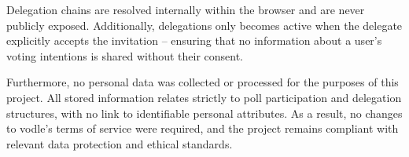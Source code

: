 Delegation chains are resolved internally within the browser and are never publicly exposed. Additionally, delegations only becomes active when the delegate explicitly accepts the invitation -- ensuring that no information about a user's voting intentions is shared without their consent.


Furthermore, no personal data was collected or processed for the purposes of this project. All stored information relates strictly to poll participation and delegation structures, with no link to identifiable personal attributes. As a result, no changes to vodle's terms of service were required, and the project remains compliant with relevant data protection and ethical standards.